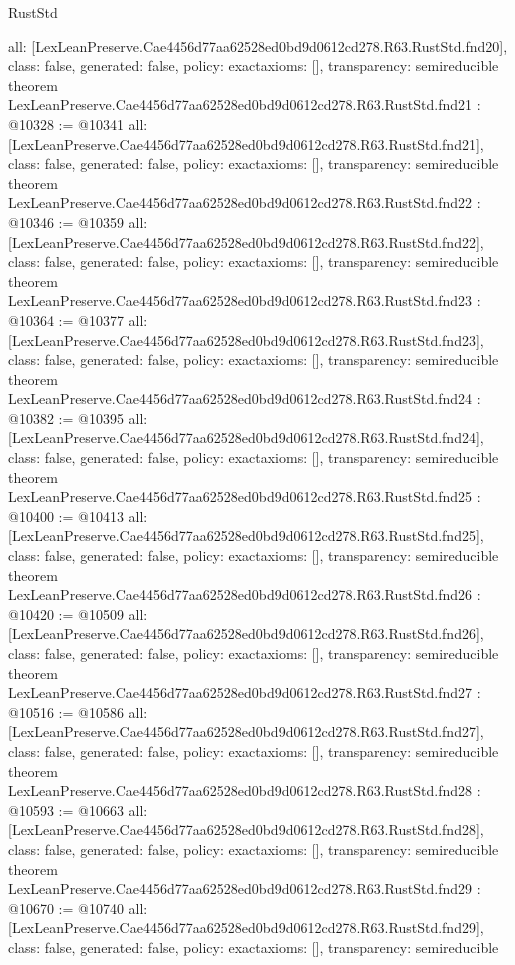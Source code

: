 \begin{lexlean}{RustStd}
\begin{coremodule}
{  all: [LexLeanPreserve.Cae4456d77aa62528ed0bd9d0612cd278.R63.RustStd.fnd20],
  class: false,
  generated: false,
  policy: exact{axioms: []},
  transparency: semireducible
}
theorem LexLeanPreserve.Cae4456d77aa62528ed0bd9d0612cd278.R63.RustStd.fnd21 : @10328 := @10341 {
  all: [LexLeanPreserve.Cae4456d77aa62528ed0bd9d0612cd278.R63.RustStd.fnd21],
  class: false,
  generated: false,
  policy: exact{axioms: []},
  transparency: semireducible
}
theorem LexLeanPreserve.Cae4456d77aa62528ed0bd9d0612cd278.R63.RustStd.fnd22 : @10346 := @10359 {
  all: [LexLeanPreserve.Cae4456d77aa62528ed0bd9d0612cd278.R63.RustStd.fnd22],
  class: false,
  generated: false,
  policy: exact{axioms: []},
  transparency: semireducible
}
theorem LexLeanPreserve.Cae4456d77aa62528ed0bd9d0612cd278.R63.RustStd.fnd23 : @10364 := @10377 {
  all: [LexLeanPreserve.Cae4456d77aa62528ed0bd9d0612cd278.R63.RustStd.fnd23],
  class: false,
  generated: false,
  policy: exact{axioms: []},
  transparency: semireducible
}
theorem LexLeanPreserve.Cae4456d77aa62528ed0bd9d0612cd278.R63.RustStd.fnd24 : @10382 := @10395 {
  all: [LexLeanPreserve.Cae4456d77aa62528ed0bd9d0612cd278.R63.RustStd.fnd24],
  class: false,
  generated: false,
  policy: exact{axioms: []},
  transparency: semireducible
}
theorem LexLeanPreserve.Cae4456d77aa62528ed0bd9d0612cd278.R63.RustStd.fnd25 : @10400 := @10413 {
  all: [LexLeanPreserve.Cae4456d77aa62528ed0bd9d0612cd278.R63.RustStd.fnd25],
  class: false,
  generated: false,
  policy: exact{axioms: []},
  transparency: semireducible
}
theorem LexLeanPreserve.Cae4456d77aa62528ed0bd9d0612cd278.R63.RustStd.fnd26 : @10420 := @10509 {
  all: [LexLeanPreserve.Cae4456d77aa62528ed0bd9d0612cd278.R63.RustStd.fnd26],
  class: false,
  generated: false,
  policy: exact{axioms: []},
  transparency: semireducible
}
theorem LexLeanPreserve.Cae4456d77aa62528ed0bd9d0612cd278.R63.RustStd.fnd27 : @10516 := @10586 {
  all: [LexLeanPreserve.Cae4456d77aa62528ed0bd9d0612cd278.R63.RustStd.fnd27],
  class: false,
  generated: false,
  policy: exact{axioms: []},
  transparency: semireducible
}
theorem LexLeanPreserve.Cae4456d77aa62528ed0bd9d0612cd278.R63.RustStd.fnd28 : @10593 := @10663 {
  all: [LexLeanPreserve.Cae4456d77aa62528ed0bd9d0612cd278.R63.RustStd.fnd28],
  class: false,
  generated: false,
  policy: exact{axioms: []},
  transparency: semireducible
}
theorem LexLeanPreserve.Cae4456d77aa62528ed0bd9d0612cd278.R63.RustStd.fnd29 : @10670 := @10740 {
  all: [LexLeanPreserve.Cae4456d77aa62528ed0bd9d0612cd278.R63.RustStd.fnd29],
  class: false,
  generated: false,
  policy: exact{axioms: []},
  transparency: semireducible
}
\end{coremodule}
\end{lexlean}
